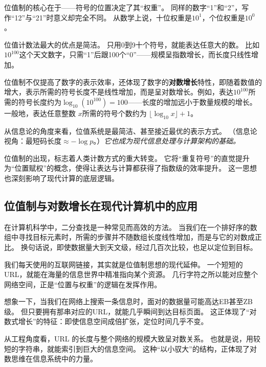 位值制的核心在于——符号的位置决定了其“权重”。  
同样的数字“1”和“2”，写作“12”与“21”时意义却完全不同。  
从数学上说，十位权重是$10^1$，个位权重是$10^0$。



位值计数法最大的优点是简洁。 
只用0到9十个符号，就能表达任意大的数。  
比如$10^{100}$这个天文数字，只需“1”后跟100个“0”——规模呈指数增长，而长度只线性增加。

位值制不仅提高了数字的表示效率，还体现了数字的{\bf 对数增长}特性，即随着数值的增大，表示所需的符号长度不是线性增加，而是呈对数增长。例如，表达$10^{100}$所需的符号长度约为$\log_{10}(10^{100})=100$——长度的增加远小于数量规模的增长。
一般地，表达任意整数 $x$所需的符号个数约为 $\lfloor \log_{10} x \rfloor + 1$。 



从信息论的角度来看，位值系统是最简洁、甚至接近最优的表示方式。  
{（信息论视角：最短码长度$\approx -\log p$。）}\emph{它也成为现代信息处理与计算架构的基础。}  



位值制的出现，标志着人类计数方式的重大转变。  
它将“重复符号”的直觉提升为“位置赋权”的概念，使得让表达与计算都获得了指数级的效率提升。  
这一思想也深刻影响了现代计算的底层逻辑。  


\subsection{位值制与对数增长在现代计算机中的应用}
  




在计算机科学中，二分查找是一种常见而高效的方法。  
当我们在一个排好序的数组中寻找目标元素时，所需的步骤并不随数组长度线性增加，而是与它的对数成正比。  
换句话说，即使数据量大到天文级，经过几百次比较，也足以定位到目标。  





我们每天使用的互联网链接，其实就是位值制思想的现代延伸。  
一个短短的URL，就能在海量的信息世界中精准指向某个资源。  
几行字符之所以能对应整个网络空间，正是“位置与权重”的逻辑在发挥作用。
  

想象一下，当我们在网络上搜索一条信息时，面对的数据量可能高达EB甚至ZB级。  
但只要拥有那串对应的URL，就能几乎瞬间到达目标页面。  
这正体现了“对数式增长”的特征：即使信息空间成倍扩张，定位时间几乎不变。






从工程角度看，URL 的长度与整个网络的规模大致呈对数关系。  
也就是说，用较短的字符串，就能索引到巨大的信息空间。  
这种“以小驭大”的结构，正体现了对数思维在信息系统中的力量。




